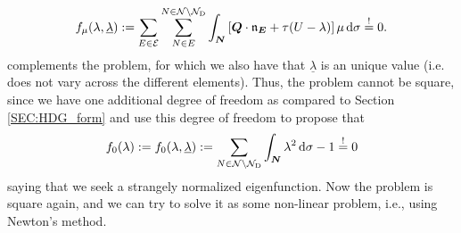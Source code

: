 \documentclass[a4paper, english, 12pt, reqno, draft]{amsart}
\theoremstyle{definition}
\theoremstyle{remark}
\numberwithin{equation}{section}
\newcommand{\setEdge}{\ensuremath{\mathcal E}}
\newcommand{\setNode}{\ensuremath{\mathcal N}}
\newcommand{\setNodeDir}{\ensuremath{\setNode_\textup D}}
\newcommand{\edge}{\ensuremath{E}}
\newcommand{\node}{\ensuremath{N}}
\newcommand{\Edge}{{\ensuremath{\boldsymbol E}}}
\newcommand{\Node}{{\ensuremath{\boldsymbol N}}}
\newcommand{\Normal}{\ensuremath{\mathfrak n_\Edge}}
\renewcommand{\vec}[1]{\ensuremath{\boldsymbol{#1}}}
\newcommand{\ds}{\ensuremath{\, \textup d \sigma}}
\newcommand{\eigenval}{\ensuremath{\underline \lambda}}
\begin{document}
% 
\begin{equation*}
 f_\mu (\lambda,\eigenval) := \sum_{\edge \in \setEdge} \sum^{\node \in \setNode \setminus \setNodeDir}_{\node \in \edge} \int_\Node \left[ \vec Q \cdot \Normal + \tau (U - \lambda) \right] \mu \ds \overset{!}= 0.
\end{equation*}
% 
complements the problem, for which we also have that $\eigenval$ is an unique value (i.e. does not vary across the different elements). Thus, the problem cannot be square, since we have one additional degree of freedom as compared to Section \ref{SEC:HDG_form} and use this degree of freedom to propose that
% 
\begin{equation*}
 f_0(\lambda) := f_0 (\lambda,\eigenval) := \sum_{\node \in \setNode \setminus \setNodeDir} \int_\Node \lambda^2 \ds - 1 \overset{!}= 0
\end{equation*}
% 
saying that we seek a strangely normalized eigenfunction. Now the problem is square again, and we can try to solve it as some non-linear problem, i.e., using Newton's method.
\end{document}
